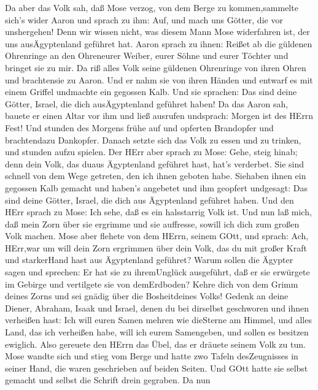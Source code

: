  Da aber das Volk sah, daß Mose verzog, von dem Berge zu
kommen,sammelte sich's wider Aaron und sprach zu ihm: Auf, und mach uns
Götter, die vor unshergehen! Denn wir wissen nicht, was diesem Mann Mose
widerfahren ist, der uns ausÄgyptenland geführet hat.  Aaron
sprach zu ihnen: Reißet ab die güldenen Ohrenringe an den Ohreneurer
Weiber, eurer Söhne und eurer Töchter und bringet sie zu mir.
 Da riß alles Volk seine güldenen Ohrenringe von ihren Ohren
und brachtensie zu Aaron.  Und er nahm sie von ihren Händen
und entwarf es mit einem Griffel undmachte ein gegossen Kalb. Und sie
sprachen: Das sind deine Götter, Israel, die dich ausÄgyptenland
geführet haben!  Da das Aaron sah, bauete er einen Altar vor
ihm und ließ ausrufen undsprach: Morgen ist des HErrn Fest! 
Und stunden des Morgens frühe auf und opferten Brandopfer und
brachtendazu Dankopfer. Danach setzte sich das Volk zu essen und zu
trinken, und stunden aufzu spielen.  Der HErr aber sprach zu
Mose: Gehe, steig hinab; denn dein Volk, das duaus Ägyptenland geführet
hast, hat's verderbet.  Sie sind schnell von dem Wege
getreten, den ich ihnen geboten habe. Siehaben ihnen ein gegossen Kalb
gemacht und haben's angebetet und ihm geopfert undgesagt: Das sind deine
Götter, Israel, die dich aus Ägyptenland geführet haben. 
Und den HErr sprach zu Mose: Ich sehe, daß es ein halsstarrig Volk ist.
 Und nun laß mich, daß mein Zorn über sie ergrimme und sie
auffresse, sowill ich dich zum großen Volk machen.  Mose
aber flehete von dem HErrn, seinem GOtt, und sprach: Ach, HErr,war um
will dein Zorn ergrimmen über dein Volk, das du mit großer Kraft und
starkerHand hast aus Ägyptenland geführet?  Warum sollen
die Ägypter sagen und sprechen: Er hat sie zu ihremUnglück ausgeführt,
daß er sie erwürgete im Gebirge und vertilgete sie von demErdboden?
Kehre dich von dem Grimm deines Zorns und sei gnädig über die
Bosheitdeines Volks!  Gedenk an deine Diener, Abraham,
Isaak und Israel, denen du bei dirselbst geschworen und ihnen verheißen
hast: Ich will euren Samen mehren wie dieSterne am Himmel, und alles
Land, das ich verheißen habe, will ich eurem Samengeben, und sollen es
besitzen ewiglich.  Also gereuete den HErrn das Übel, das
er dräuete seinem Volk zu tun.  Mose wandte sich und stieg
vom Berge und hatte zwo Tafeln desZeugnisses in seiner Hand, die waren
geschrieben auf beiden Seiten.  Und GOtt hatte sie selbst
gemacht und selbst die Schrift drein gegraben.  Da nun
